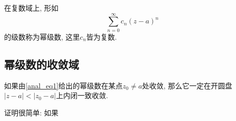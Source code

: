 在复数域上, 形如
\begin{equation}\label{anal_eq1}
\sum_{n=0}^\infty c_n(z-a)^n
\end{equation}
的级数称为幂级数, 这里$c_n$皆为复数.

\subsection{幂级数的收敛域}
\begin{theorem}{}
如果由\autoref{anal_eq1}给出的幂级数在某点$z_0\neq a$处收敛, 那么它一定在开圆盘$|z-a|<|z_0-a|$上内闭一致收敛.
\end{theorem}

证明很简单: 如果
